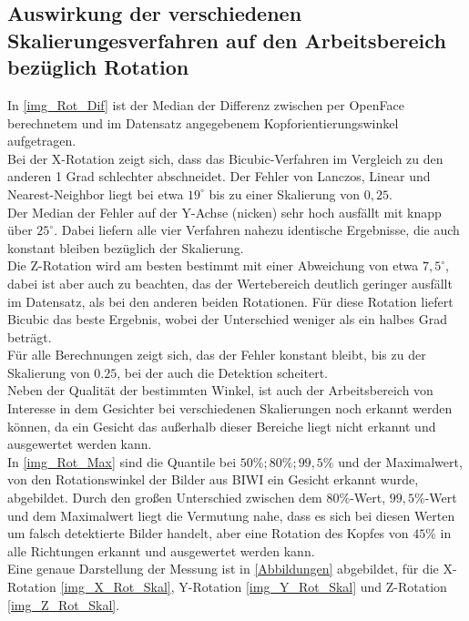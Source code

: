 \subsection{Auswirkung der verschiedenen Skalierungesverfahren auf den Arbeitsbereich bezüglich Rotation}
In \autoref{img_Rot_Dif} ist der Median der Differenz zwischen per OpenFace berechnetem und im Datensatz angegebenem Kopforientierungswinkel aufgetragen.\\
Bei der X-Rotation zeigt sich, dass das Bicubic-Verfahren im Vergleich zu den anderen 1 Grad schlechter abschneidet. Der Fehler von Lanczos, Linear und Nearest-Neighbor liegt bei etwa $19^\circ$ bis zu einer Skalierung von $0,25$.\\
Der Median der Fehler auf der Y-Achse (nicken) sehr hoch ausfällt mit knapp über $25^\circ$. 
Dabei liefern alle vier Verfahren nahezu identische Ergebnisse, die auch konstant bleiben bezüglich der Skalierung.\\
Die Z-Rotation wird am besten bestimmt mit einer Abweichung von etwa $7,5^\circ$, dabei ist aber auch zu beachten, das der Wertebereich deutlich geringer ausfällt im Datensatz, als bei den anderen beiden Rotationen. Für diese Rotation liefert Bicubic das beste Ergebnis, wobei der Unterschied weniger als ein halbes Grad beträgt.\\
Für alle Berechnungen zeigt sich, das der Fehler konstant bleibt, bis zu der Skalierung von $0.25$, bei der auch die Detektion scheitert.\\
Neben der Qualität der bestimmten Winkel, ist auch der Arbeitsbereich von Interesse in dem Gesichter bei verschiedenen Skalierungen noch erkannt werden können, da ein Gesicht das außerhalb dieser Bereiche liegt nicht erkannt und ausgewertet werden kann.\\
In \autoref{img_Rot_Max} sind die Quantile bei $50\%; 80\%; 99,5\%$ und der Maximalwert, von den Rotationswinkel der Bilder aus BIWI \cite{database_Face_Ori} ein Gesicht erkannt wurde, abgebildet. Durch den großen Unterschied zwischen dem $80\%$-Wert, $99,5\%$-Wert und dem Maximalwert liegt die Vermutung nahe, dass es sich bei diesen Werten um falsch detektierte Bilder handelt, aber eine Rotation des Kopfes von $45\%$ in alle Richtungen erkannt und ausgewertet werden kann.\\
Eine genaue Darstellung der Messung ist in \autoref{Abbildungen} abgebildet, für die X-Rotation \autoref{img_X_Rot_Skal}, Y-Rotation \autoref{img_Y_Rot_Skal} und Z-Rotation \autoref{img_Z_Rot_Skal}.

